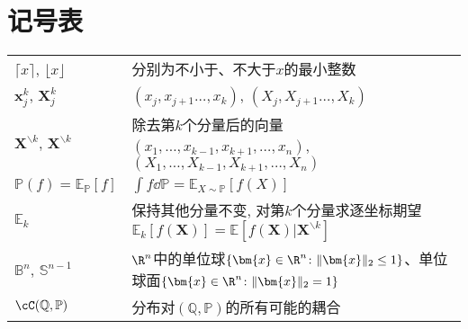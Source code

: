 \section*{记号表}

\noindent
\begin{tabular}{p{} p{}}
\hline
	$\lceil x \rceil$, $\lfloor x \rfloor$ & 分别为不小于、不大于$x$的最小整数 \\
	$\bm{x}_j^k$, $\bm{X}_j^k$ & $(x_j, x_{j+1} \dots, x_k)$, $(X_j, X_{j+1} \dots, X_k)$ \\
	$\bm{X}^{\backslash k}$, $\bm{X}^{\backslash k}$ & 除去第$k$个分量后的向量$(x_1, \dots, x_{k-1}, x_{k+1}, \dots, x_n)$, $(X_1, \dots, X_{k-1}, X_{k+1}, \dots, X_n)$ \\
	$\mathbb{P}(f) = \mathbb{E}_{\mathbb{P}}[f]$ & $\int f \dd \mathbb{P} = \mathbb{E}_{X \sim \mathbb{P}} [f(X)]$ \\
	$\mathbb{E}_k$ & 保持其他分量不变, 对第$k$个分量求逐坐标期望$\mathbb{E}_k[f(\bm{X})] = \mathbb{E}[f(\bm{X}) | \bm{X}^{\backslash k}]$ \\
	$\mathbb{B}^n$, $\mathbb{S}^{n-1}$ & $\R^n$中的单位球$\{\bm{x} \in \R^n \colon \|\bm{x}\|_2 \leq 1 \}$、单位球面$\{\bm{x} \in \R^n \colon \|\bm{x}\|_2 = 1 \}$ \\
	$\cC(\mathbb{Q}, \mathbb{P})$ & 分布对$(\mathbb{Q}, \mathbb{P})$的所有可能的耦合 \\
\hline
\end{tabular}
